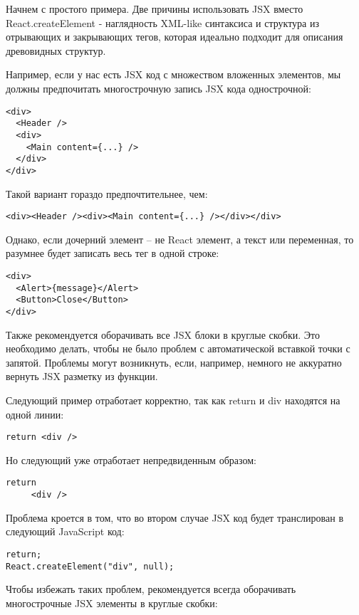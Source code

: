 Начнем с простого примера. Две причины использовать JSX вместо React.createElement - наглядность XML-like синтаксиса и структура из отрывающих и закрывающих тегов, которая идеально подходит для описания древовидных структур.

Например, если у нас есть JSX код с множеством вложенных элементов, мы должны предпочитать многострочную запись JSX кода однострочной:

\begin{lstlisting}
<div>
  <Header />
  <div>
    <Main content={...} />
  </div>
</div>
\end{lstlisting}

Такой вариант гораздо предпочтительнее, чем:

\begin{lstlisting}
<div><Header /><div><Main content={...} /></div></div>
\end{lstlisting}

Однако, если дочерний элемент -- не React элемент, а текст или переменная, то разумнее будет записать весь тег в одной строке:

\begin{lstlisting}
<div>
  <Alert>{message}</Alert>
  <Button>Close</Button>
</div>
\end{lstlisting}

Также рекомендуется оборачивать все JSX блоки в круглые скобки. Это необходимо делать, чтобы не было проблем с автоматической вставкой точки с запятой. Проблемы могут возникнуть, если, например, немного не аккуратно вернуть JSX разметку из функции.

Следующий пример отработает корректно, так как return и div находятся на одной линии:

\begin{lstlisting}
return <div />
\end{lstlisting}

Но следующий уже отработает непредвиденным образом:

\begin{lstlisting}
return
     <div />
\end{lstlisting}
     
Проблема кроется в том, что во втором случае JSX код будет транслирован в следующий JavaScript код:

\begin{lstlisting}
return;
React.createElement("div", null);
\end{lstlisting}
   
Чтобы избежать таких проблем, рекомендуется всегда оборачивать многострочные JSX элементы в круглые скобки:

